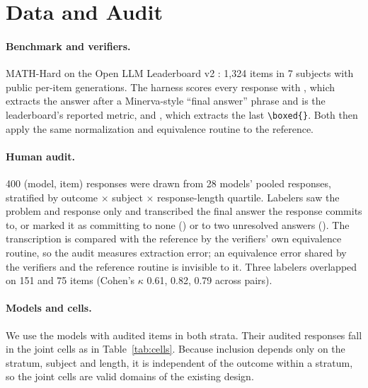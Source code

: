 \section{Data and Audit}
\label{sec:data}

\paragraph{Benchmark and verifiers.} MATH-Hard \citep{hendrycks2021math} on
the Open LLM Leaderboard v2 \citep{fourrier2024openllm}: 1{,}324 items in 7
subjects with public per-item generations. The harness scores every response
with , which extracts the answer after a Minerva-style
``final answer'' phrase \citep{lewkowycz2022minerva} and is the leaderboard's
reported metric, and , which extracts the last
\verb|\boxed{}|. Both then apply the same normalization and equivalence
routine to the reference.

\paragraph{Human audit.} 400 (model, item) responses were drawn from 28
models' pooled responses, stratified by  outcome
$\times$ subject $\times$ response-length quartile. Labelers saw the problem
and response only and transcribed the final answer the response commits to,
or marked it as committing to none () or to two unresolved answers
(). The transcription is compared with the reference by
the verifiers' own equivalence routine, so the audit measures extraction
error; an equivalence error shared by the verifiers and the reference routine
is invisible to it. Three labelers overlapped on 151 and 75 items (Cohen's
$\kappa$ 0.61, 0.82, 0.79 across pairs).

\paragraph{Models and cells.} We use the \nNModels{} models with audited
items in both  strata. Their audited responses fall in the
joint cells as in Table~\ref{tab:cells}. Because inclusion depends only on the
 stratum, subject and length, it is independent of the
 outcome within a stratum, so the joint cells are valid
domains of the existing design.
